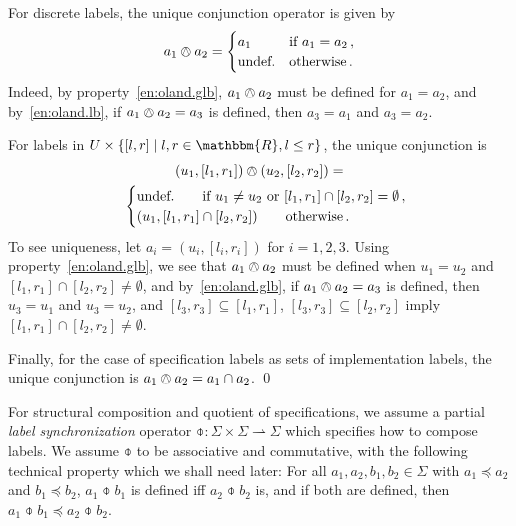 \documentclass[twocolumn]{svjour3-dummy}
\newcommand*\labpre{\preccurlyeq}
\newcommand*\Real{\mathbbm{R}}
\newcommand*\oland{\owedge}
\newcommand*\parto{\rightharpoonup}
\begin{document}
\begin{example}
  \label{ex:conjunction}
  For discrete labels, the unique conjunction operator is given by
  \begin{equation*}
    a_1\oland a_2=
    \begin{cases}
      a_1 &\text{if } a_1= a_2\,,\\
      \text{undef.} &\text{otherwise}\,.
    \end{cases}
  \end{equation*}
  Indeed, by property~\eqref{en:oland.glb}, $a_1\oland a_2$ must be
  defined for $a_1= a_2$, and by~\eqref{en:oland.lb}, if $a_1\oland
  a_2= a_3$ is defined, then $a_3= a_1$ and $a_3= a_2$.

  For labels in $U\times\{[ l, r]\mid l, r\in \Real, l\le r\}$,
  the unique conjunction is
  \begin{multline*}
    ( u_1,[ l_1, r_1])\oland( u_2,[ l_2, r_2])= \\ \qquad
    \begin{cases}
      \text{undef.} \qquad\text{if } u_1\ne u_2\text{ or }[ l_1,
      r_1]\cap[ l_2, r_2]= \emptyset\,,\\
      ( u_1,[ l_1, r_1]\cap[ l_2, r_2]) \qquad\text{otherwise}\,.
    \end{cases}
  \end{multline*}
  To see uniqueness, let $a_i=( u_i,[ l_i, r_i])$ for $i= 1, 2, 3$.
  Using property~\eqref{en:oland.glb}, we see that $a_1\oland a_2$
  must be defined when $u_1= u_2$ and $[ l_1, r_1]\cap[ l_2, r_2]\ne
  \emptyset$, and by~\eqref{en:oland.glb}, if $a_1\oland a_2= a_3$ is
  defined, then $u_3= u_1$ and $u_3= u_2$, and $[ l_3, r_3]\subseteq[
  l_1, r_1]$, $[ l_3, r_3]\subseteq[ l_2, r_2]$ imply $[ l_1,
  r_1]\cap[ l_2, r_2]\ne \emptyset$.

  Finally, for the case of specification labels as sets of
  implementation labels, the unique conjunction is $a_1\oland a_2=
  a_1\cap a_2$. \qed
\end{example}

For structural composition and quotient of specifications, we assume a
partial \emph{label synchronization} operator $\mathord{\obar}:
\Sigma\times \Sigma\parto \Sigma$ which specifies how to compose
labels.  We assume $\obar$ to be associative and commutative, with the
following technical property which we shall need later: For all $a_1,
a_2, b_1, b_2\in \Sigma$ with $a_1\labpre a_2$ and $b_1\labpre b_2$,
$a_1\obar b_1$ is defined iff $a_2\obar b_2$ is, and if both are
defined, then $a_1\obar b_1\labpre a_2\obar b_2$.
\end{document}
